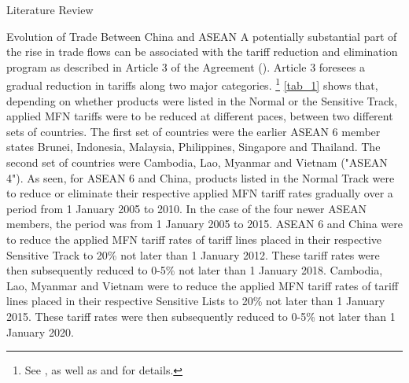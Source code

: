 \begin{section}{Literature Review}
\begin{subsection}{Evolution of Trade Between China and ASEAN}
A potentially substantial part of the rise in trade flows can be associated with the tariff reduction and elimination program as described in Article 3 of the Agreement (\cite{asean_2002_1}). Article 3 foresees a gradual reduction in tariffs along two major categories. \footnote{See \cite{asean_2002_4}, as well as \cite{asean_2002_2} and \cite{asean_2002_3} for details.} \autoref{tab_1} shows that, depending on whether products were listed in the Normal or the Sensitive Track, applied MFN tariffs were to be reduced at different paces, between two different sets of countries. The first set of countries were the earlier ASEAN 6 member states Brunei, Indonesia, Malaysia, Philippines, Singapore and Thailand. The second set of countries were Cambodia, Lao, Myanmar and Vietnam ("ASEAN 4"). As seen, for ASEAN 6 and China, products listed in the Normal Track were to reduce or eliminate their respective applied MFN tariff rates gradually over a period from 1 January 2005 to 2010. In the case of the four newer ASEAN members, the period was from 1 January 2005 to 2015. ASEAN 6 and China were to reduce the applied MFN tariff rates of tariff lines placed in their respective Sensitive Track to 20\% not later than 1 January 2012. These tariff rates were then subsequently reduced to 0-5\% not later than 1 January 2018. Cambodia, Lao, Myanmar and Vietnam were to reduce the applied MFN tariff rates of tariff lines placed in their respective Sensitive Lists to 20\% not later than 1 January 2015. These tariff rates were then subsequently reduced to 0-5\% not later than 1 January 2020. 


\end{subsection}
\end{section}
